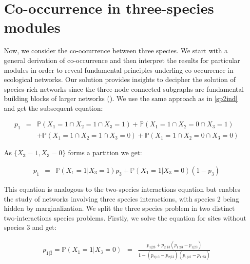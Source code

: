   \section*{Co-occurrence in three-species modules}
  \label{3spcooc}

Now, we consider the co-occurrence between three species. We start with a
general derivation of co-occurrence and then interpret the results for
particular modules in order to reveal fundamental principles underling co-occurrence in
ecological networks. Our solution provides insights to decipher the solution
of species-rich networks since the three-node connected subgraphs are
fundamental building blocks of larger networks (\citealt{Milo2002,
Stouffer2007, Stouffer2010c}). We use the same approach as in \eqref{sp2ind} and get the subsequent equation:

  \begin{eqnarray} \label{sp3p1}
    \nonumber p_1&=& \mathbb{P}(X_{1}=1\cap X_{2}=1\cap X_{3}=1) +  \mathbb{P}(X_{1}=1\cap X_{2}=0\cap X_{3}=1) \\
      &&+ \mathbb{P}(X_{1}=1 \cap X_{2}=1 \cap X_{3}=0)+ \mathbb{P}(X_{1}=1 \cap X_{2}=0 \cap X_{3}=0)
  \end{eqnarray}


As $\{X_{3}=1,X_{3}=0\}$ forms a partition we get:

  \begin{eqnarray} \label{sp3p1b}
    p_1&=& \mathbb{P}(X_{1}=1| X_{3}=1)p_3 + \mathbb{P}(X_{1}=1| X_{3}=0)(1-p_3)
  \end{eqnarray}

This equation is analogous to the two-species interactions equation but enables the study of networks involving three species interactions, with species 2 being hidden by marginalization. We split the three species problem in two distinct two-interactions species problems. Firstly, we solve the equation for sites without species 3 and get:

  \begin{eqnarray}
    \label{sols2}
     p_{1|\overline{3}}=\mathbb{P}(X_{1}=1| X_{3}=0)&=& \frac{p_{1|\overline{2}\overline{3}}+ p_{2|\overline{1}\overline{3}} (p_{1|2\overline{3}}- p_{1|\overline{2}\overline{3}})}{1- (p_{2|1\overline{3}}-p_{2|\overline{1}\overline{3}})( p_{1|2\overline{3}} - p_{1|\overline{2}\overline{3}})}
 \end{eqnarray}

